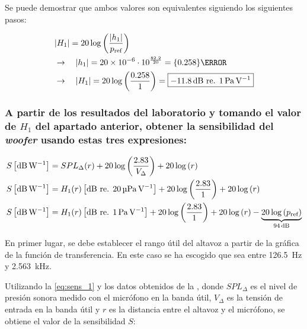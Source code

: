 \documentclass[10pt]{article}
\begin{document}
Se puede demostrar que ambos valores son equivalentes siguiendo los siguientes pasos:

\begin{align*}
   & \abs{H_1} = 20 \log \left( \frac{\abs{h_1}}{p _{\textnormal{ref}}} \right)                                                            \\
   & \rightarrow \quad \abs{h_1} = \num{20e-6}  \cdot 10 ^{\frac{82.2}{20}} = \qty{0.258}{\pascal }                                        \\
   & \rightarrow \quad \abs{H_1} = 20 \log \left( \frac{0.258}{1} \right) = \boxed{\SI{-11.8}{\dB} \text{ re. } \SI{1}{\pascal\per\volt} }
\end{align*}

\subsubsection{A partir de los resultados del laboratorio y tomando el valor de $H_1$ del apartado anterior, obtener la sensibilidad del \textit{woofer} usando estas tres expresiones:}
\begin{align} \label{eq:sens_1}
  S \left[ \SI{}{\dB\per\watt} \right] & = SPL_{\Delta} (r) + 20 \log \left( \frac{2.83}{V_{\Delta}} \right) + 20 \log \left( r \right)                                                                                                                       \\ \label{eq:sens_2}
  S \left[ \SI{}{\dB\per\watt} \right] & = H_1(r) \left[ \SI{}{\dB}\text{ re. }\SI{20}{\micro\pascal\per\volt} \right] + 20 \log \left( \frac{2.83}{1} \right) + 20 \log \left( r \right)                                                                     \\ \label{eq:sens_3}
  S \left[ \SI{}{\dB\per\watt} \right] & = H_1(r) \left[ \SI{}{\dB}\text{ re. }\SI{1}{\pascal\per\volt} \right] + 20 \log \left( \frac{2.83}{1} \right) + 20 \log \left( r \right) - \underbrace{20 \log \left( p _{\textnormal{ref}} \right)}_{\SI{94}{\dB}}
\end{align}

En primer lugar, se debe establecer el rango útil del altavoz a partir de la gráfica de la función de transferencia. En este caso se ha escogido que sea entre \qty{126.5}{\hertz } y \qty{2.563}{\kilo \hertz }.

Utilizando la \autoref{eq:sens_1} y los datos obtenidos de la , donde $SPL_{\Delta}$ es el nivel de presión sonora medido con el micrófono en la banda útil, $V_{\Delta}$ es la tensión de entrada en la banda útil y $r$ es la distancia entre el altavoz y el micrófono, se obtiene el valor de la sensibilidad $S$:
\end{document}

